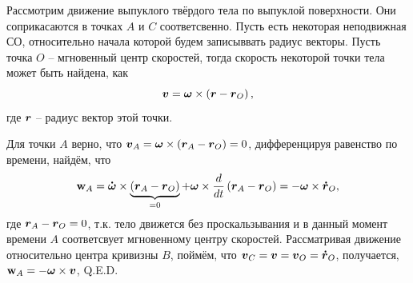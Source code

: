 \begin{figure}
  \begin{center}
      \vspace{-50mm}
  \end{center}
\end{figure}

Рассмотрим движение выпуклого твёрдого тела по выпуклой поверхности. Они соприкасаются в точках $A$ и $C$ соответсвенно. Пусть есть некоторая неподвижная СО, относительно начала которой будем записыввать радиус векторы. Пусть точка $O$ -- мгновенный центр скоростей, тогда скорость некоторой точки тела может быть найдена, как
$$
    \mbox{\boldmath $v$} = \mbox{\boldmath $\omega$} \times \left(
        \mbox{\boldmath $r$} - \mbox{\boldmath $r$}_O
    \right),
$$
где $\mbox{\boldmath $r$}$ -- радиус вектор этой точки.

Для точки $A$ верно, что $\mbox{\boldmath $v$}_A = \mbox{\boldmath $\omega$} \times \left(\mbox{\boldmath $r$}_A - \mbox{\boldmath $r$}_O\right) = 0$, дифференцируя равенство по времени, найдём, что
$$
    \mbox{\boldmath $\mathrm{w}$}_A = \mbox{\boldmath $\dot{\omega}$} \times \underbrace{\left(\mbox{\boldmath $r$}_A - \mbox{\boldmath $r$}_O\right)}_{= 0} + \mbox{\boldmath $\omega$} \times \frac{d}{dt} \left(\mbox{\boldmath $r$}_{A}- \mbox{\boldmath $r$}_O\right) =
    - \mbox{\boldmath $\omega$} \times \mbox{\boldmath $\dot{r}$}_O,
$$
где $\mbox{\boldmath $r$}_A - \mbox{\boldmath $r$}_O = 0$, т.к. тело движется без проскальзывания и в данный момент времени $A$ соответсвует мгновенному центру скоростей.
Рассматривая движение относительно центра кривизны $B$, поймём, что $\mbox{\boldmath $v$}_C = \mbox{\boldmath $v$} = \mbox{\boldmath $v$}_O = \mbox{\boldmath $\dot{r}$}_O$, получается, $\mbox{\boldmath $\mathrm{w}$}_A = - \mbox{\boldmath $\omega$} \times \mbox{\boldmath $v$}$, Q.E.D.

